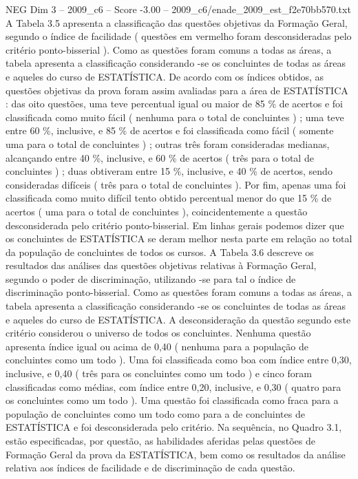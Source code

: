 \begin{textsample}{NEG Dim 3 – 2009\_c6 – Score -3.00 – 2009\_c6/enade\_2009\_est\_f2e70bb570.txt}
A Tabela 3.5 apresenta a classificação das questões objetivas da Formação Geral, segundo o índice de facilidade ( questões em vermelho foram desconsideradas pelo critério ponto-bisserial ).
Como as questões foram comuns a todas as áreas, a tabela apresenta a classificação considerando -se os concluintes de todas as áreas e aqueles do curso de ESTATÍSTICA.
De acordo com os índices obtidos, as questões objetivas da prova foram assim avaliadas para a área de ESTATÍSTICA : das oito questões, uma teve percentual igual ou maior de 85 \% de acertos e foi classificada como muito fácil ( nenhuma para o total de concluintes ) ; uma teve entre 60 \%, inclusive, e 85 \% de acertos e foi classificada como fácil ( somente uma para o total de concluintes ) ; outras três foram consideradas medianas, alcançando entre 40 \%, inclusive, e 60 \% de acertos ( três para o total de concluintes ) ; duas obtiveram entre 15 \%, inclusive, e 40 \% de acertos, sendo consideradas difíceis ( três para o total de concluintes ).
Por fim, apenas uma foi classificada como muito difícil tento obtido percentual menor do que 15 \% de acertos ( uma para o total de concluintes ), coincidentemente a questão desconsiderada pelo critério ponto-bisserial.
Em linhas gerais podemos dizer que os concluintes de ESTATÍSTICA se deram melhor nesta parte em relação ao total da população de concluintes de todos os cursos.
A Tabela 3.6 descreve os resultados das análises das questões objetivas relativas à Formação Geral, segundo o poder de discriminação, utilizando -se para tal o índice de discriminação ponto-bisserial.
Como as questões foram comuns a todas as áreas, a tabela apresenta a classificação considerando -se os concluintes de todas as áreas e aqueles do curso de ESTATÍSTICA.
A desconsideração da questão segundo este critério considerou o universo de todos os concluintes.
Nenhuma questão apresenta índice igual ou acima de 0,40 ( nenhuma para a população de concluintes como um todo ).
Uma foi classificada como boa com índice entre 0,30, inclusive, e 0,40 ( três para os concluintes como um todo ) e cinco foram classificadas como médias, com índice entre 0,20, inclusive, e 0,30 ( quatro para os concluintes como um todo ).
Uma questão foi classificada como fraca para a população de concluintes como um todo como para a de concluintes de ESTATÍSTICA e foi desconsiderada pelo critério.
Na sequência, no Quadro 3.1, estão especificadas, por questão, as habilidades aferidas pelas questões de Formação Geral da prova da ESTATÍSTICA, bem como os resultados da análise relativa aos índices de facilidade e de discriminação de cada questão.

\end{textsample}
